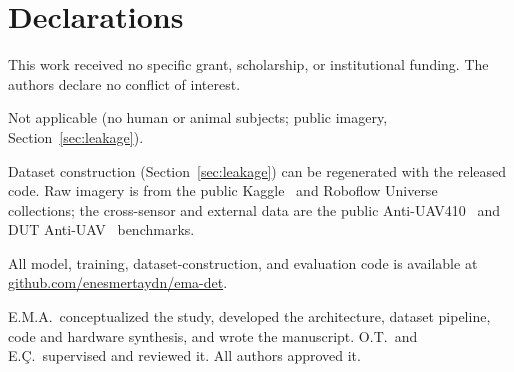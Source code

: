 \documentclass[pdflatex,sn-mathphys-num,iicol]{sn-jnl}%
\begin{document}
\backmatter

\section*{Declarations}

This work received no specific grant, scholarship, or institutional funding.
The authors declare no conflict of interest.

Not applicable (no human or animal subjects; public imagery, Section~\ref{sec:leakage}).

Dataset construction (Section~\ref{sec:leakage}) can be regenerated with the released code. Raw imagery is from the public
Kaggle~\cite{dasmehdixtr_kaggle} and Roboflow Universe~\cite{mohsen_roboflow}
collections; the cross-sensor and external data are the public Anti-UAV410~\cite{antiuav410}
and DUT Anti-UAV~\cite{zhao2022antiuav} benchmarks.

All model, training, dataset-construction, and evaluation code is
available at \href{https://github.com/enesmertaydn/ema-det}{github.com/enesmertaydn/ema-det}.

E.M.A.\ conceptualized the study, developed the architecture, dataset pipeline, code and
hardware synthesis, and wrote the manuscript. O.T.\ and E.\c{C}.\ supervised and reviewed it. All authors approved it.

{\footnotesize\setlength{\itemsep}{0pt}
}
\end{document}
